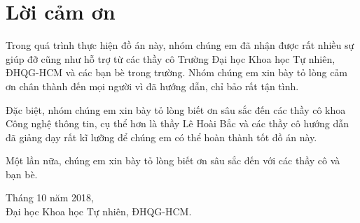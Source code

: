 \cleardoublepage
{}
{}
\section*{Lời cảm ơn}
\vspace{1.0in}
\begingroup
\setlength{\parindent}{0pt}
Trong quá trình thực hiện đồ án này, nhóm chúng em đã nhận được rất nhiều sự giúp đỡ cũng như hỗ trợ từ các thầy cô Trường Đại học Khoa học Tự nhiên, ĐHQG-HCM và các bạn bè
trong trường. Nhóm chúng em xin bày tỏ lòng cảm ơn chân thành đến mọi người vì đã hướng dẫn, chỉ bảo rất tận tình.

Đặc biệt, nhóm chúng em xin bày tỏ lòng biết ơn sâu sắc đến các thầy cô khoa Công nghệ
thông tin, cụ thể hơn là thầy Lê Hoài Bắc và các thầy cô hướng dẫn đã giảng dạy rất kĩ lưỡng để chúng em có thể hoàn thành tốt đồ án này.\par

Một lần nữa, chúng em xin bày tỏ lòng biết ơn sâu sắc đến với các thầy cô và bạn bè.\par

Tháng 10 năm 2018,\\
{Đại học Khoa học Tự nhiên, ĐHQG-HCM.}\\
\endgroup
\newpage
